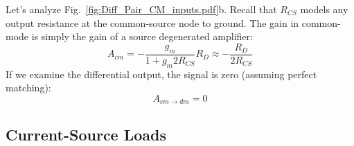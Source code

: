 Let's analyze Fig.~\ref{fig:Diff_Pair_CM_inputs.pdf}b.  Recall that $R_{CS}$ models any output resistance at the common-source node to ground.   The gain in common-mode is simply the gain of a source degenerated amplifier:
%
\begin{equation}
	A_{cm} = -\frac{g_m}{1 + g_m 2R_{CS}} R_D \approx -\frac{R_D}{2R_{CS}}
\end{equation}
% 
If we examine the differential output, the signal is zero (assuming perfect matching):
%
\begin{equation}
	A_{cm \to dm} = 0
\end{equation}
 

\subsection{Current-Source Loads}


